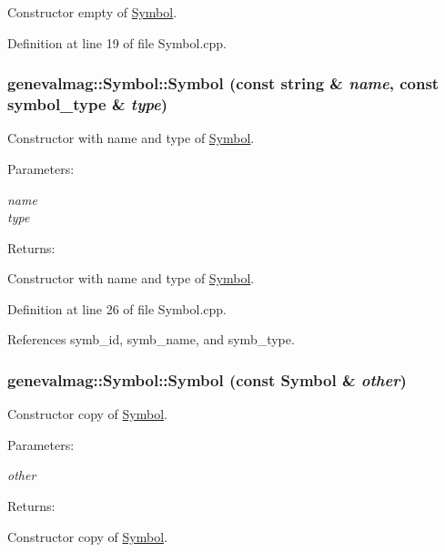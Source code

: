 Constructor empty of \hyperlink{classgenevalmag_1_1Symbol}{Symbol}. 

Definition at line 19 of file Symbol.cpp.\hypertarget{classgenevalmag_1_1Symbol_2b522913fae452ad9c5a32587a122450}{
\subsubsection[{Symbol}]{\setlength{\rightskip}{0pt plus 5cm}genevalmag::Symbol::Symbol (const string \& {\em name}, \/  const {\bf symbol\_\-type} \& {\em type})}}
\label{classgenevalmag_1_1Symbol_2b522913fae452ad9c5a32587a122450}


Constructor with name and type of \hyperlink{classgenevalmag_1_1Symbol}{Symbol}. \begin{Desc}
\item[Parameters:]
\begin{description}
\item[{\em name}]\item[{\em type}]\end{description}
\end{Desc}
\begin{Desc}
\item[Returns:]\end{Desc}
Constructor with name and type of \hyperlink{classgenevalmag_1_1Symbol}{Symbol}. 

Definition at line 26 of file Symbol.cpp.

References symb\_\-id, symb\_\-name, and symb\_\-type.\hypertarget{classgenevalmag_1_1Symbol_16cbf4081db9ad6ba822270ede78cfb6}{
\subsubsection[{Symbol}]{\setlength{\rightskip}{0pt plus 5cm}genevalmag::Symbol::Symbol (const {\bf Symbol} \& {\em other})}}
\label{classgenevalmag_1_1Symbol_16cbf4081db9ad6ba822270ede78cfb6}


Constructor copy of \hyperlink{classgenevalmag_1_1Symbol}{Symbol}. \begin{Desc}
\item[Parameters:]
\begin{description}
\item[{\em other}]\end{description}
\end{Desc}
\begin{Desc}
\item[Returns:]\end{Desc}
Constructor copy of \hyperlink{classgenevalmag_1_1Symbol}{Symbol}. 

